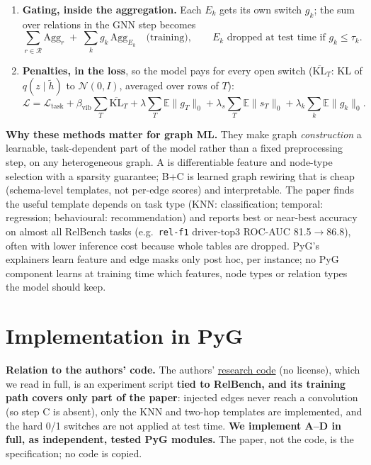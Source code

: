 \documentclass{article}
\newcommand{\code}[1]{\texttt{#1}}
\newcommand{\E}{\mathbb{E}}
\begin{document}
\begin{enumerate}
\item[\textbf{C}] \textbf{Gating, inside the aggregation.} Each $E_k$ gets its own switch $g_k$; the sum over relations in the GNN step becomes
\vspace{-0.35em}
\begin{equation*}
\textstyle\sum_{r\in\mathcal R}\mathrm{Agg}_r\;+\;\sum_k g_k\,\mathrm{Agg}_{E_k}\quad\text{(training)},\qquad E_k \text{ dropped at test time if } g_k\le\tau_k.
\end{equation*}
\vspace{-1.1em}
\item[\textbf{D}] \textbf{Penalties, in the loss}, so the model pays for every open switch ($\overline{\mathrm{KL}}_T$: KL of $q(z\mid\tilde h)$ to $\mathcal N(0,I)$, averaged over rows of $T$):
\vspace{-0.35em}
\begin{equation*}
\textstyle\mathcal L=\mathcal L_{\text{task}}+\beta_{\text{vib}}\sum_T\overline{\mathrm{KL}}_T+\lambda\sum_T\E\|g_T\|_0+\lambda_s\sum_T\E\|s_T\|_0+\lambda_k\sum_k\E\|g_k\|_0 .
\end{equation*}
\end{enumerate}
\textbf{Why these methods matter for graph ML.} They make graph \emph{construction} a learnable, task-dependent part of the model rather than a fixed preprocessing step, on any heterogeneous graph. A is differentiable feature and node-type selection with a sparsity guarantee; B+C is learned graph rewiring that is cheap (schema-level templates, not per-edge scores) and interpretable. The paper finds the useful template depends on task type (KNN: classification; temporal: regression; behavioural: recommendation) and reports best or near-best accuracy on almost all RelBench tasks (e.g.\ \code{rel-f1} driver-top3 ROC-AUC 81.5$\to$86.8), often with lower inference cost because whole tables are dropped. PyG's explainers learn feature and edge masks only post hoc, per instance; no PyG component learns at training time which features, node types or relation types the model should keep.
\vspace{-1.1em}
\section{Implementation in PyG}
\vspace{-0.5em}

\textbf{Relation to the authors' code.} The authors' \href{https://github.com/cy623/Structural_Optimizer_RDL}{research code} (no license), which we read in full, is an experiment script \textbf{tied to RelBench, and its training path covers only part of the paper}: injected edges never reach a convolution (so step C is absent), only the KNN and two-hop templates are implemented, and the hard 0/1 switches are not applied at test time. \textbf{We implement A--D in full, as independent, tested PyG modules.} The paper, not the code, is the specification; no code is copied.
\end{document}

